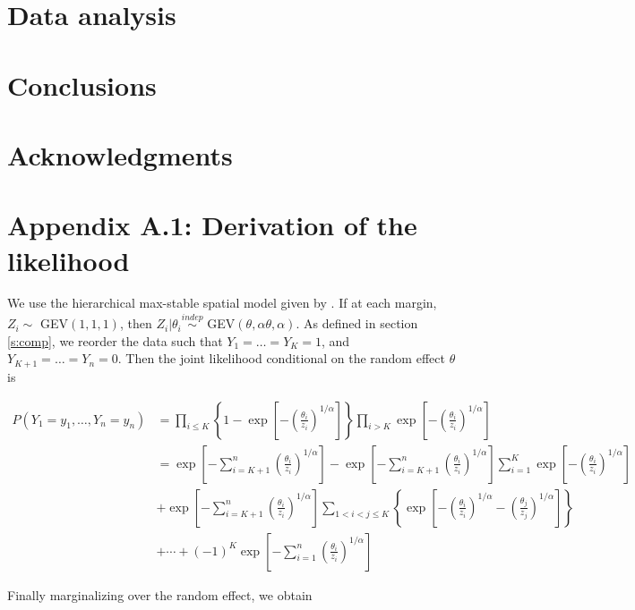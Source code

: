\documentclass[11pt]{article}
\newcommand{\indep}{\stackrel{indep}{\sim}}
\begin{document}
\section{Data analysis}\label{s:analysis}

\section{Conclusions}\label{s:con}

\section*{Acknowledgments}

\section*{Appendix A.1: Derivation of the likelihood}
We use the hierarchical max-stable spatial model given by \citet{reich-2012}. If at each margin, $Z_i \sim $ GEV$(1,1,1)$, then $Z_i | \theta_i \indep $ GEV$(\theta, \alpha \theta, \alpha)$. As defined in section \ref{s:comp}, we reorder the data such that $Y_1=\ldots=Y_K=1$, and $Y_{K+1} = \ldots = Y_n = 0$. Then the joint likelihood conditional on the random effect $\theta$ is

\begin{align} \label{joint_cond}
	P(Y_1=y_1,\ldots,Y_n=y_n) &= \prod_{ i \le K } \left\{ 1 - \exp \left[ - \left( \frac{ \theta_i }{ z_i } \right)^{ 1/\alpha} \right] \right \} \prod_{ i > K } \exp \left[ -\left( \frac{ \theta_i }{ z_i } \right)^{1/\alpha} \right] \nonumber \\[0.5em]
		&= \exp \left[ -\sum_{ i = K+1}^{ n }\left( \frac{ \theta_i }{ z_i } \right)^{1/\alpha} \right] - \exp \left[ -\sum_{ i = K+1}^{ n }\left( \frac{ \theta_i }{ z_i } \right)^{1/\alpha} \right] \sum_{ i = 1}^{K} \exp\left[ -\left( \frac{ \theta_i }{ z_i } \right)^{ 1/\alpha} \right] \nonumber\\
		&  + \exp \left[ -\sum_{ i = K+1}^{ n }\left( \frac{ \theta_i }{ z_i } \right)^{1/\alpha} \right] \sum_{ 1 < i < j \le K } \left\{ \exp \left[ - \left( \frac{ \theta_i }{ z_i } \right)^{ 1/\alpha} - \left( \frac{ \theta_j }{ z_j } \right)^{ 1/\alpha } \right] \right \} \nonumber \\[0.5em]
		& + \cdots + (-1)^K \exp\left[ - \sum_{ i = 1 }^{ n }\left( \frac{ \theta_i }{ z_i } \right)^{ 1/\alpha} \right]
\end{align}

Finally marginalizing over the random effect, we obtain
\end{document}
